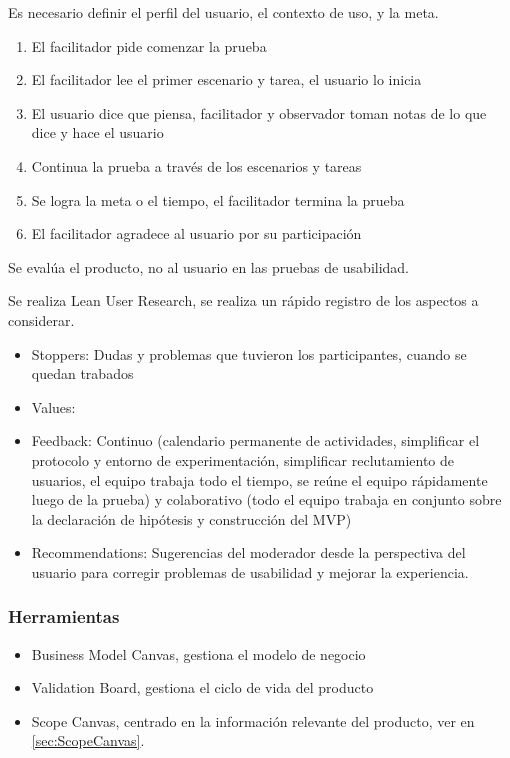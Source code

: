 \documentclass[titlepage,a4paper]{article}
\begin{document}
Es necesario definir el perfil del usuario, el contexto de uso, y la meta.

\begin{enumerate}
    \item El facilitador pide comenzar la prueba
    \item El facilitador lee el primer escenario y tarea, el usuario lo inicia
    \item El usuario dice que piensa, facilitador y observador toman notas de lo que dice y hace el usuario
    \item Continua la prueba a través de los escenarios y tareas
    \item Se logra la meta o el tiempo, el facilitador termina la prueba
    \item El facilitador agradece al usuario por su participación
\end{enumerate}

Se evalúa el producto, no al usuario en las pruebas de usabilidad.

Se realiza Lean User Research, se realiza un rápido registro de los aspectos a considerar.
\begin{itemize}
    \item Stoppers: Dudas y problemas que tuvieron los participantes, cuando se quedan trabados
    \item Values:
    \item Feedback: Continuo (calendario permanente de actividades, simplificar el protocolo y entorno de experimentación, simplificar reclutamiento de usuarios, el equipo trabaja todo el tiempo, se reúne el equipo rápidamente luego de la prueba) y colaborativo (todo el equipo trabaja en conjunto sobre la declaración de hipótesis y construcción del MVP)
    \item Recommendations: Sugerencias del moderador desde la perspectiva del usuario para corregir problemas de usabilidad y mejorar la experiencia.
\end{itemize}


\subsubsection*{Herramientas}
\begin{itemize}
    \item Business Model Canvas, gestiona el modelo de negocio
    \item Validation Board, gestiona el ciclo de vida del producto
    \item Scope Canvas, centrado en la información relevante del producto, ver en \ref{sec:ScopeCanvas}.
\end{itemize}
\end{document}
